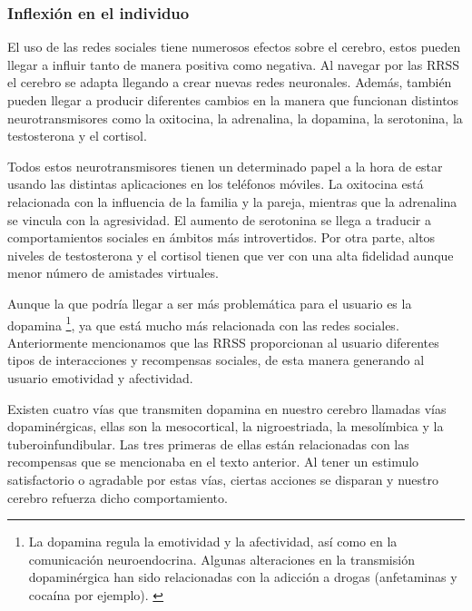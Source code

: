\subsubsection{Inflexión en el individuo}

El uso de las redes sociales tiene numerosos efectos sobre el cerebro, estos pueden llegar a influir tanto de manera positiva como negativa. Al navegar por las \acs{RRSS} el cerebro se adapta llegando a crear nuevas redes neuronales. \cite{Cerebro-RRSS-AS} Además, también pueden llegar a producir diferentes cambios en la manera que funcionan distintos neurotransmisores como la oxitocina, la adrenalina, la dopamina, la serotonina, la testosterona y el cortisol.

\vspace{0.3cm}

Todos estos neurotransmisores tienen un determinado papel a la hora de estar usando las distintas aplicaciones en los teléfonos móviles. La oxitocina está relacionada con la influencia de la familia y la pareja, mientras que la adrenalina se vincula con la agresividad. El aumento de serotonina se llega a traducir a comportamientos sociales en ámbitos más introvertidos. Por otra parte, altos niveles de testosterona y el cortisol tienen que ver con una alta fidelidad aunque menor número de amistades virtuales.

\vspace{0.3cm}

Aunque la que podría llegar a ser más problemática para el usuario es la dopamina \footnote{La dopamina regula la emotividad y la afectividad, así como en la comunicación neuroendocrina. Algunas alteraciones en la transmisión dopaminérgica han sido relacionadas con la adicción a drogas (anfetaminas y cocaína por ejemplo). \cite{bahena2000dopamina}}, ya que está mucho más relacionada con las redes sociales. Anteriormente mencionamos que las \acs{RRSS} proporcionan al usuario diferentes tipos de interacciones y recompensas sociales, de esta manera generando al usuario emotividad y afectividad.

\vspace{0.3cm}

Existen cuatro vías que transmiten dopamina en nuestro cerebro llamadas vías dopaminérgicas, ellas son la mesocortical, la nigroestriada, la mesolímbica y la tuberoinfundibular. Las tres primeras de ellas están relacionadas con las recompensas que se mencionaba en el texto anterior. Al tener un estimulo satisfactorio o agradable por estas vías, ciertas acciones se disparan y nuestro cerebro refuerza dicho comportamiento. \cite{Xataka-RRSS-AS}

